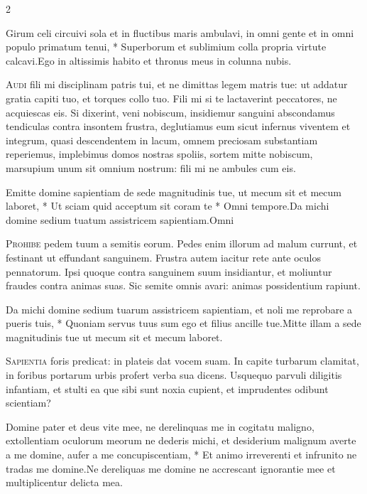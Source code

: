 \begin{multicols*}{2}
\begin{responsory}
{Girum celi circuivi sola et in fluctibus maris ambulavi, in omni gente et in omni populo primatum tenui, * Superborum et sublimium colla propria virtute calcavi.}{Ego in altissimis habito et thronus meus in colunna nubis.}%
\end{responsory}%
\lettrine[lines=2]{\zallmancaps \color{Blue} A}{udi} fili mi disciplinam patris tui, et ne dimittas legem matris tue: ut addatur gratia capiti tuo, et torques collo tuo. Fili mi si te lactaverint peccatores, ne acquiescas eis. Si dixerint, veni nobiscum, insidiemur sanguini abscondamus tendiculas contra insontem frustra, deglutiamus eum sicut infernus viventem et integrum, quasi descendentem in lacum, omnem preciosam substantiam reperiemus, implebimus domos nostras spoliis, sortem mitte nobiscum, marsupium unum sit omnium nostrum: fili mi ne ambules cum eis.
\begin{responsory-final}
{Emitte domine sapientiam de sede magnitudinis tue, ut mecum sit et mecum laboret, * Ut sciam quid acceptum sit coram te * Omni tempore.}{Da michi domine sedium tuatum assistricem sapientiam.}{Omni}
\end{responsory-final}%
\lettrine[lines=2]{\zallmancaps \color{Red} P}{rohibe} pedem tuum a semitis eorum. Pedes enim illorum ad malum currunt, et festinant ut effundant sanguinem. Frustra autem iacitur rete ante oculos pennatorum. Ipsi quoque contra sanguinem suum insidiantur, et moliuntur fraudes contra animas suas. Sic semite omnis avari: animas possidentium rapiunt.
\begin{responsory}
{Da michi domine sedium tuarum assistricem sapientiam, et noli me reprobare a pueris tuis, * Quoniam servus tuus sum ego et filius ancille tue.}{Mitte illam a sede magnitudinis tue ut mecum sit et mecum laboret.}
\end{responsory}%
\lettrine[lines=2]{\zallmancaps \color{Blue} S}{apientia} foris predicat: in plateis dat vocem suam. In capite turbarum clamitat, in foribus portarum urbis profert verba sua dicens. Usquequo parvuli diligitis infantiam, et stulti ea que sibi sunt noxia cupient, et imprudentes odibunt scientiam?
\begin{responsory}
{Domine pater et deus vite mee, ne derelinquas me in cogitatu maligno, extollentiam oculorum meorum ne dederis michi, et desiderium malignum averte a me domine, aufer a me concupiscentiam, * Et animo irreverenti et infrunito ne tradas me domine.}{Ne dereliquas me domine ne accrescant ignorantie mee et multiplicentur delicta mea.}

\end{responsory}
\end{multicols*}
